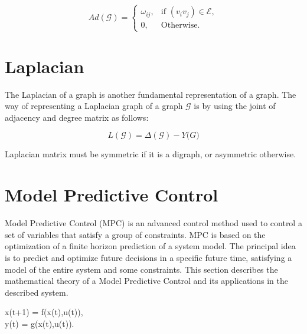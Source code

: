 \begin{equation}
    Ad(\mathcal{G}) = \left\{\begin{matrix}
\omega_{ij},   & \text{if } (v_{i}v_{j}) \in \mathcal{E}, \\ 
0, &  \text{Otherwise.}
\end{matrix}\right.
\end{equation}


\section*{Laplacian}

The Laplacian of a graph is another fundamental representation of a graph. The way of representing a Laplacian graph of a graph $\mathcal{G}$ is by using the joint of adjacency and degree matrix as follows:

\begin{equation}
    L(\mathcal{G}) = \Delta (\mathcal{G}) - Y\mathcal(G)
\end{equation}

Laplacian matrix must be symmetric if it is a digraph, or asymmetric otherwise. 

















\section{Model Predictive Control}

Model Predictive Control (MPC) is an advanced control method used to control a set of variables that satisfy a group of constraints. MPC is based on the optimization of a finite horizon prediction of a system model. The principal idea is to predict and optimize future decisions in a specific future time, satisfying a model of the entire system and some constraints. This section describes the mathematical theory of a Model Predictive Control and its applications in the described system.



\begin{center}
    x(t+1) = f(x(t),u(t)),\label{eq:mpc2}\\
    y(t) = g(x(t),u(t)). \label{eq:mpc}
\end{center}



